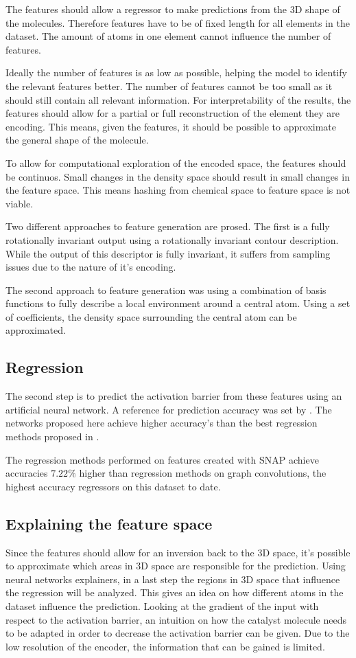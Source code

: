 The features should allow a regressor to make predictions from the 3D shape of the molecules.
Therefore features have to be of fixed length for all elements in the dataset.
The amount of atoms in one element cannot influence the number of features.

Ideally the number of features is as low as possible, helping the model to identify the relevant features better.
The number of features cannot be too small as it should still contain all relevant information.
For interpretability of the results, the features should allow for a partial or full reconstruction of the element they are encoding.
This means, given the features, it should be possible to approximate the general shape of the molecule.

To allow for computational exploration of the encoded space, the features should be continuos.
Small changes in the density space should result in small changes in the 
feature space. 
This means hashing from chemical space to feature space is not viable.

Two different approaches to feature generation are prosed.
The first is a fully rotationally invariant output using a rotationally invariant contour description.
While the output of this descriptor is fully invariant, it suffers from sampling issues due to the nature of it's encoding.

The second approach to feature generation was using a combination of basis functions to fully describe a local environment around a central atom.
Using a set of coefficients, the density space surrounding the central atom can be approximated.

\subsection{Regression}

The second step is to predict the activation barrier from these features using an artificial neural network.
A reference for prediction accuracy was set by \cite{friederich_dos}.
The networks proposed here achieve higher accuracy's than the best regression methods proposed in \cite{friederich_dos}.

The regression methods performed on features created with SNAP achieve accuracies $7.22\%$ higher than regression methods on graph convolutions,
the highest accuracy regressors on this dataset to date.

\subsection{Explaining the feature space}
Since the features should allow for an inversion back to the 3D space, it's possible to approximate which areas in 3D space are responsible for the prediction.
Using neural networks explainers, in  a last step the regions in 3D space that influence the regression will be analyzed.
This gives an idea on how different atoms in the dataset influence the prediction.
Looking at the gradient of the input with respect to the activation barrier, an intuition on how the catalyst molecule needs to be 
adapted in order to decrease the activation barrier can be given.
Due to the low resolution of the encoder, the information that can be gained is limited.